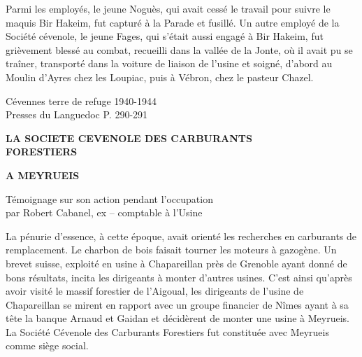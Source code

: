 \vspace{0.45cm}

Parmi les employés, le jeune Noguès, qui avait cessé le travail pour suivre le maquis
Bir Hakeim, fut capturé à la Parade et fusillé. Un autre employé de la Société
cévenole, le jeune Fages, qui s’était aussi engagé à Bir Hakeim, fut grièvement
blessé au combat, recueilli dans la vallée de la Jonte, où il avait pu se traîner,
transporté dans la voiture de liaison de l’usine et soigné, d’abord au Moulin d’Ayres
chez les Loupiac, puis à Vébron, chez le pasteur Chazel.

\vfill

\begin{flushright}
Cévennes terre de refuge 1940-1944\\
Presses du Languedoc P. 290-291
\end{flushright}

\clearpage


\begin{center}
    {\Large\bfseries
    LA SOCIETE CEVENOLE DES CARBURANTS\\
    FORESTIERS
    }

    \vspace{0.7cm}

    {\Large\bfseries
    A MEYRUEIS
    }

    \vspace{0.9cm}

    Témoignage sur son action pendant l’occupation\\
    par Robert Cabanel, ex – comptable à l’Usine
\end{center}

\vspace{1.1cm}

La pénurie d’essence, à cette époque, avait orienté les recherches en carburants de
remplacement. Le charbon de bois faisait tourner les moteurs à gazogène. Un brevet suisse,
exploité en usine à Chapareillan près de Grenoble ayant donné de bons résultats, incita les
dirigeants à monter d’autres usines. C’est ainsi qu’après avoir visité le massif forestier de
l’Aigoual, les dirigeants de l’usine de Chapareillan se mirent en rapport avec un groupe
financier de Nîmes ayant à sa tête la banque Arnaud et Gaidan et décidèrent de monter une
usine à Meyrueis. La Société Cévenole des Carburants Forestiers fut constituée avec Meyrueis
comme siège social.

